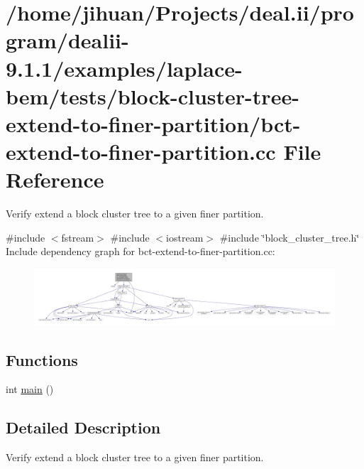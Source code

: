\hypertarget{bct-extend-to-finer-partition_8cc}{}\section{/home/jihuan/\+Projects/deal.ii/program/dealii-\/9.1.1/examples/laplace-\/bem/tests/block-\/cluster-\/tree-\/extend-\/to-\/finer-\/partition/bct-\/extend-\/to-\/finer-\/partition.cc File Reference}
\label{bct-extend-to-finer-partition_8cc}


Verify extend a block cluster tree to a given finer partition.  


{\ttfamily \#include $<$fstream$>$}\newline
{\ttfamily \#include $<$iostream$>$}\newline
{\ttfamily \#include \char`\"{}block\+\_\+cluster\+\_\+tree.\+h\char`\"{}}\newline
Include dependency graph for bct-\/extend-\/to-\/finer-\/partition.cc\+:\nopagebreak
\begin{figure}[H]
\begin{center}
\leavevmode
\includegraphics[width=350pt]{bct-extend-to-finer-partition_8cc__incl}
\end{center}
\end{figure}
\subsection*{Functions}
\begin{DoxyCompactItemize}
\item 
int \hyperlink{bct-extend-to-finer-partition_8cc_ae66f6b31b5ad750f1fe042a706a4e3d4}{main} ()
\end{DoxyCompactItemize}


\subsection{Detailed Description}
Verify extend a block cluster tree to a given finer partition. 

